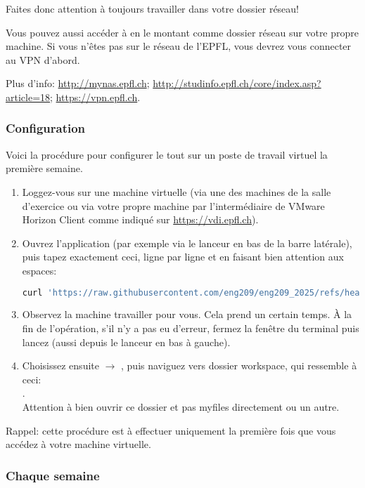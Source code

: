\documentclass[10pt]{article}
\begin{document}
Faites donc attention à toujours travailler dans votre dossier réseau!

Vous pouvez aussi accéder à  en le montant comme dossier réseau sur votre propre machine. Si vous n'êtes pas sur le réseau de l'EPFL, vous devrez vous connecter au VPN d'abord.

Plus d'info: \url{http://mynas.epfl.ch}; \url{http://studinfo.epfl.ch/core/index.asp?article=18}; \url{https://vpn.epfl.ch}.

\subsubsection*{Configuration}

Voici la procédure pour configurer le tout sur un poste de travail virtuel la première semaine.
\begin{enumerate}
\item Loggez-vous sur une machine virtuelle (via une des machines de la salle d'exercice ou via votre propre machine par l'intermédiaire de VMware Horizon Client comme indiqué sur \url{https://vdi.epfl.ch}).
\item Ouvrez l'application  (par exemple via le lanceur en bas de la barre latérale), puis tapez exactement ceci, ligne par ligne et en faisant bien attention aux espaces:\\
\begin{lstlisting}[language=Bash]
curl 'https://raw.githubusercontent.com/eng209/eng209_2025/refs/heads/main/setup.sh' | bash -s
\end{lstlisting}
\item Observez la machine travailler pour vous. Cela prend un certain temps. À la fin de l'opération, s'il n'y a pas eu d'erreur, fermez la fenêtre du terminal puis lancez  (aussi depuis le lanceur en bas à gauche).
\item Choisissez ensuite  $\rightarrow$ , puis naviguez vers dossier workspace, qui ressemble à ceci:\\
.\\
Attention à bien ouvrir ce dossier et pas myfiles directement ou un autre.
\end{enumerate}

Rappel: cette procédure est à effectuer uniquement la première fois que vous accédez à votre machine virtuelle.

\subsubsection*{Chaque semaine}
\end{document}
